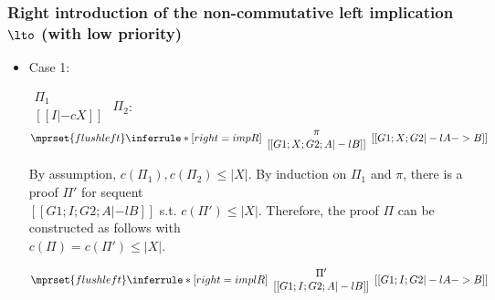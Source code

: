 \subsubsection{Right introduction of the non-commutative left implication $\lto$ (with low priority)}
\begin{itemize}
\item Case 1:
      \begin{center}
        \scriptsize
        \begin{math}
          \begin{array}{c}
            \Pi_1 \\
            {[[I |-c X]]}
          \end{array}
        \end{math}
        \qquad\qquad
        $\Pi_2$:
        \begin{math}
          $$\mprset{flushleft}
          \inferrule* [right={\tiny impR}] {
            {
              \begin{array}{c}
                \pi \\
                {[[G1; X; G2; A |-l B]]}
              \end{array}
            }
          }{[[G1; X; G2 |-l A -> B]]}
        \end{math}
      \end{center}
      By assumption, $c(\Pi_1),c(\Pi_2)\leq |X|$. By induction on $\Pi_1$
      and $\pi$, there is a proof $\Pi'$ for sequent \\
      $[[G1; I; G2; A |-l B]]$ s.t. $c(\Pi') \leq |X|$. Therefore, the
      proof $\Pi$ can be constructed as follows with \\
      $c(\Pi) = c(\Pi') \leq |X|$.
      \begin{center}
        \scriptsize
        \begin{math}
          $$\mprset{flushleft}
          \inferrule* [right={\tiny implR}] {
            {
              \begin{array}{c}
                \Pi' \\
                {[[G1; I; G2; A |-l B]]}
              \end{array}
            }
          }{[[G1; I; G2 |-l A -> B]]}
        \end{math}
      \end{center}


\end{itemize}
